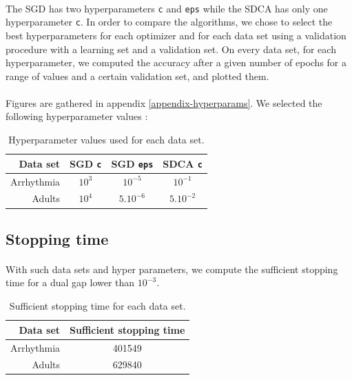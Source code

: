 \documentclass{article}
\begin{document}
\paragraph{}The SGD has two hyperparameters \texttt{c} and \texttt{eps} while the SDCA has only one hyperparameter \texttt{c}.
In order to compare the algorithms, we chose to select the best hyperparameters for each optimizer and for each data set using a validation procedure with a learning set and a validation set.
On every data set, for each hyperparameter, we computed the accuracy after a given number of epochs for a range of values and a certain validation set, and plotted them.

\paragraph{}Figures are gathered in appendix \ref{appendix-hyperparams}. We selected the following hyperparameter values :
\begin{table}[H]
	\centering
	\begin{tabular}{rccc}
		\toprule
		Data set   & SGD \texttt{c} & SGD \texttt{eps} & SDCA \texttt{c}\\
		\midrule
		Arrhythmia & $10^3$         & $10^{-5}$        & $10^{-1}$      \\
		Adults     & $10^4$         & $5.10^{-6}       $ & $5.10^{-2}$  \\
		\bottomrule
	\end{tabular}
	\caption{Hyperparameter values used for each data set.}
\end{table}

\subsection{Stopping time}

\paragraph{}With such data sets and hyper parameters, we compute the sufficient stopping time for a dual gap lower than $10^{-3}$.
\begin{table}[H]
	\centering
	\begin{tabular}{rc}
		\toprule
		Data set   & Sufficient stopping time\\
		\midrule
		Arrhythmia & 401549                \\
		Adults     & 629840                \\
		\bottomrule
	\end{tabular}
	\caption{Sufficient stopping time for each data set.}
\end{table}
\end{document}
